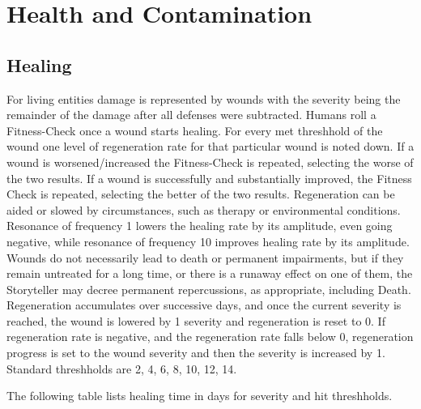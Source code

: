 \section{Health and Contamination}\label{sec:healthandcontamination}
\subsection{Healing}\label{subsec:healing}
For living entities damage is represented by wounds with the severity being the remainder of the damage after all
defenses were subtracted.
Humans roll a Fitness-Check once a wound starts healing.
For every met threshhold of the wound one level of regeneration rate for that particular wound is noted down.
If a wound is worsened/increased the Fitness-Check is repeated, selecting the worse of the two results.
If a wound is successfully and substantially improved, the Fitness Check is repeated, selecting the better of the two
results.
Regeneration can be aided or slowed by circumstances, such as therapy or environmental conditions.
Resonance of frequency 1 lowers the healing rate by its amplitude, even going negative, while resonance of frequency 10
improves healing rate by its amplitude.
Wounds do not necessarily lead to death or permanent impairments, but if they remain untreated for a long time, or there
is a runaway effect on one of them, the Storyteller may decree permanent repercussions, as appropriate, including Death.
Regeneration accumulates over successive days, and once the current severity is reached, the wound is lowered by 1
severity and regeneration is reset to 0.
If regeneration rate is negative, and the regeneration rate falls below 0, regeneration progress is set to the wound
severity and then the severity is increased by 1.
Standard threshholds are 2, 4, 6, 8, 10, 12, 14. \par
The following table lists healing time in days for severity and hit threshholds.\par
